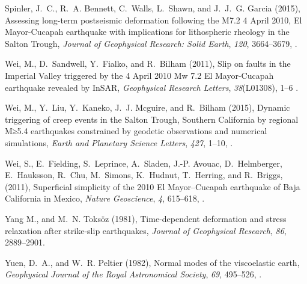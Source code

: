 \documentclass[draft,linenumbers]{AGUJournal}
\begin{document}
\begin{thebibliography}{52}
Spinler, J.~C., R.~A. Bennett, C.~Walls, L.~Shawn, and J.~J.~G. Garcia (2015), {Assessing long-term postseismic deformation following the M7.2 4 April 2010, El Mayor-Cucapah earthquake with implications for lithospheric rheology in the Salton Trough}, \textit{Journal of Geophysical Research: Solid Earth}, \textit{120}, 3664--3679, .

Wei, M., D.~Sandwell, Y.~Fialko, and R.~Bilham (2011{}), {Slip on faults in the Imperial Valley triggered by the 4 April 2010 Mw 7.2 El Mayor-Cucapah earthquake revealed by InSAR}, \textit{Geophysical Research Letters}, \textit{38}(L01308), 1--6 .

Wei, M., Y.~Liu, Y.~Kaneko, J.~J. Mcguire, and R.~Bilham (2015), {Dynamic triggering of creep events in the Salton Trough, Southern California by regional M≥5.4 earthquakes constrained by geodetic observations and numerical simulations}, \textit{Earth and Planetary Science Letters}, \textit{427}, 1--10, .

Wei, S., E.~Fielding, S.~Leprince, A.~Sladen, J.-P. Avouac, D.~Helmberger, E.~Hauksson, R.~Chu, M.~Simons, K.~Hudnut, T.~Herring, and R.~Briggs,(2011{}), {Superficial simplicity of the 2010 El Mayor–Cucapah earthquake of Baja California in Mexico}, \textit{Nature Geoscience}, \textit{4}, 615--618, .

Yang M., and M.~N. Toks\"oz (1981), {Time-dependent deformation and stress relaxation after strike-slip earthquakes}, \textit{Journal of Geophysical Research}, \textit{86}, 2889--2901.

Yuen, D.~A., and W.~R. Peltier (1982), {Normal modes of the viscoelastic earth}, \textit{Geophysical Journal of the Royal Astronomical Society}, \textit{69}, 495--526, .

\end{thebibliography}

\listofchanges
\end{document}
